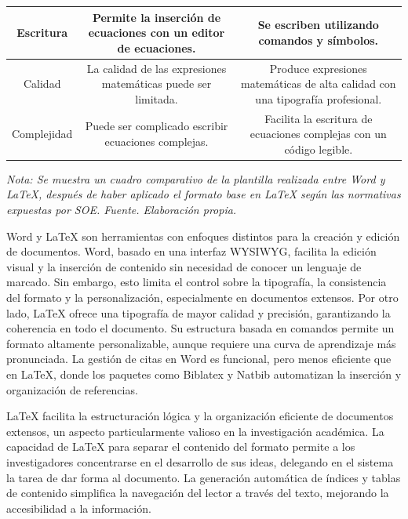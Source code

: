 \documentclass[12pt,twocolumn]{article}
\begin{document}
\begin{table}[ht!]
{\begin{tabular}{|c|c|c|}
            {Escritura}        & Permite la inserción de ecuaciones con un editor de ecuaciones.        & Se escriben utilizando comandos y símbolos.                \\ \hline
            {Calidad}         & La calidad de las expresiones matemáticas puede ser limitada.         & Produce expresiones matemáticas de alta calidad con una tipografía profesional.\\ \hline
            {Complejidad}     & Puede ser complicado escribir ecuaciones complejas.          & Facilita la escritura de ecuaciones complejas con un código legible.              \\ \hline
            \end{tabular}
        }
        \textit{Nota: Se muestra un cuadro comparativo de la plantilla realizada entre Word y LaTeX, después de haber aplicado el formato base en LaTeX según las normativas expuestas por SOE. Fuente. Elaboración propia.}
        \label{tab:Comparativas}
    \end{table}
\vspace{0.5cm}
Word y LaTeX son herramientas con enfoques distintos para la creación y edición de documentos. 
Word, basado en una interfaz WYSIWYG, facilita la edición visual y la inserción de contenido sin necesidad de conocer un lenguaje de marcado. 
Sin embargo, esto limita el control sobre la tipografía, la consistencia del formato y la personalización, especialmente en documentos extensos. 
Por otro lado, LaTeX ofrece una tipografía de mayor calidad y precisión, garantizando la coherencia en todo el documento. 
Su estructura basada en comandos permite un formato altamente personalizable, aunque requiere una curva de aprendizaje más pronunciada. 
La gestión de citas en Word es funcional, pero menos eficiente que en LaTeX, donde los paquetes como Biblatex y Natbib automatizan la inserción y organización de referencias.

LaTeX facilita la estructuración lógica y la organización eficiente de documentos extensos, un aspecto particularmente valioso en la investigación académica. 
La capacidad de LaTeX para separar el contenido del formato permite a los investigadores concentrarse en el desarrollo de sus ideas, delegando en el sistema la tarea de dar forma al documento. 
La generación automática de índices y tablas de contenido simplifica la navegación del lector a través del texto, mejorando la accesibilidad a la información.
\end{document}
